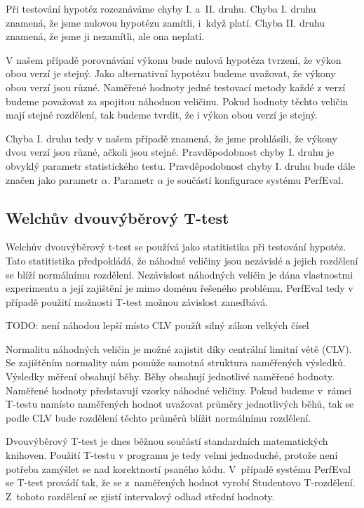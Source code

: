 Při testování hypotéz rozeznáváme
chyby I. a~II. druhu. Chyba I. druhu znamená, že jsme nulovou hypotézu zamítli,
i~když platí. Chyba II. druhu znamená, že jsme ji nezamítli, ale ona neplatí.

V našem případě porovnávání výkonu bude nulová hypotéza tvrzení, že výkon obou verzí je stejný.
Jako alternativní hypotézu budeme uvažovat, že výkony obou verzí jsou různé.
Naměřené hodnoty jedné testovací metody každé z verzí budeme považovat za spojitou náhodnou veličinu.
Pokud hodnoty těchto veličin mají stejné rozdělení, tak budeme tvrdit, že i výkon obou verzí je stejný.

Chyba I. druhu tedy v našem případě znamená, že jsme prohlásili, že výkony dvou verzí jsou různé,
ačkoli jsou stejné. Pravděpodobnost chyby I. druhu je obvyklý parametr statistického testu.
Pravděpodobnost chyby I. druhu bude dále značen jako parametr $\alpha$. Parametr $\alpha$
je součástí konfigurace systému PerfEval.

\subsection{Welchův dvouvýběrový T-test}

Welchův dvouvýběrový t-test se používá jako statitistika při testování hypotéz.
Tato statitistika předpokládá, že náhodné veličiny jsou nezávislé a jejich rozdělení
se blíží normálnímu rozdělení. Nezávislost náhodných veličin je dána vlastnostmi
experimentu \cite[]{twosampletests} a její zajištění je mimo doménu řešeného problému. PerfEval
tedy v případě použití možnosti T-test možnou závislost zanedbává.

TODO: není náhodou lepší místo CLV použít silný zákon velkých čísel

Normalitu náhodných veličin je možné zajistit díky centrální limitní větě (CLV).
Se zajištěním normality nám pomůže samotná struktura naměřených výsledků. Výsledky měření
obsahují běhy. Běhy obsahují jednotlivé naměřené hodnoty. Naměřené hodnoty představují
vzorky náhodné veličiny. Pokud budeme v~rámci T-testu namísto naměřených hodnot uvažovat
průměry jednotlivých běhů, tak se podle CLV bude rozdělení těchto průměrů blížit normálnímu rozdělení.

Dvouvýběrový T-test je dnes běžnou součástí standardních matematických knihoven.
Použití T-testu v programu je tedy velmi jednoduché, protože není potřeba zamýšlet se
nad korektností psaného kódu. V~případě systému PerfEval se T-test provádí tak, že
se z~naměřených hodnot vyrobí Studentovo T-rozdělení. Z~tohoto rozdělení se zjistí
intervalový odhad střední hodnoty.

